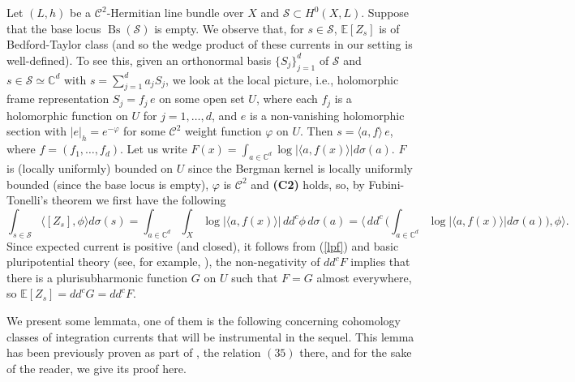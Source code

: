 \documentclass[11pt,leqno,oneside]{amsart}
\numberwithin{equation}{section}
\begin{document}
Let $(L, h)$ be a $\mathscr{C}^2$-Hermitian line bundle over $X$ and $\mathcal{S} \subset H^{0}(X, L)$. Suppose that the base locus $\operatorname{Bs}(\mathcal{S})$ is empty. We observe that, for $s\in \mathcal{S}$, $\mathbb{E}[Z_{s}]$ is of Bedford-Taylor class (and so the wedge product of these currents in our setting is well-defined). To see this, given an orthonormal basis $\{S_{j}\}^{d}_{j=1}$ of $\mathcal{S}$ and $s\in \mathcal{S} \simeq \mathbb{C}^d$ with $s=\sum_{j=1}^{d}{a_{j} S_{j}}$, we look at the local picture, i.e., holomorphic frame representation $S_{j}=f_{j}\,e$ on some open set $U$, where each $f_{j}$ is a holomorphic function on $U$ for $j=1, \ldots, d$, and $e$ is a non-vanishing holomorphic section with $|e|_{h}=e^{-\varphi}$ for some $\mathscr{C}^{2}$ weight function $\varphi$ on $U$. Then $s=\langle a, f \rangle \,e$, where $f=(f_{1}, \ldots, f_{d})$. Let us write $F(x)=\int_{a\in \mathbb{C}^d}{\log| \langle a, f(x)\rangle| d\sigma(a)}$. $F$ is (locally uniformly) bounded on $U$ since the Bergman kernel is locally uniformly bounded (since the base locus is empty), $\varphi$ is $\mathscr{C}^2$ and \textbf{(C2)} holds, so, by Fubini-Tonelli's theorem we first have the following
\begin{equation}\label{lpf}
\int_{s\in \mathcal{S}}{\langle [Z_{s}], \phi \rangle d\sigma(s)}=\int_{a\in \mathbb{C}^d}\int_{X}{\log{|\langle a, f(x) \rangle|} \,dd^c\phi \, d\sigma(a)}= \langle \, dd^c \, \Big(\int_{a\in \mathbb{C}^d}{\log| \langle a, f(x)\rangle| d\sigma(a)} \Big), \phi \rangle.
\end{equation} Since expected current is positive (and closed), it follows from (\ref{lpf}) and basic pluripotential theory (see, for example, \cite[Theorem 4.15]{BrTr07}), the non-negativity of $dd^c F$ implies that there is a plurisubharmonic function $G$ on $U$ such that $F=G$ almost everywhere, so $\mathbb{E}[Z_{s}]=dd^c G=dd^c F$.






We present some lemmata, one of them is the following concerning cohomology classes of integration currents that will be instrumental in the sequel. This lemma has been previously proven as part of \cite[Theorem 3.1]{Shif}, the relation $(35)$ there, and for the sake of the reader, we give its proof here.
\end{document}
